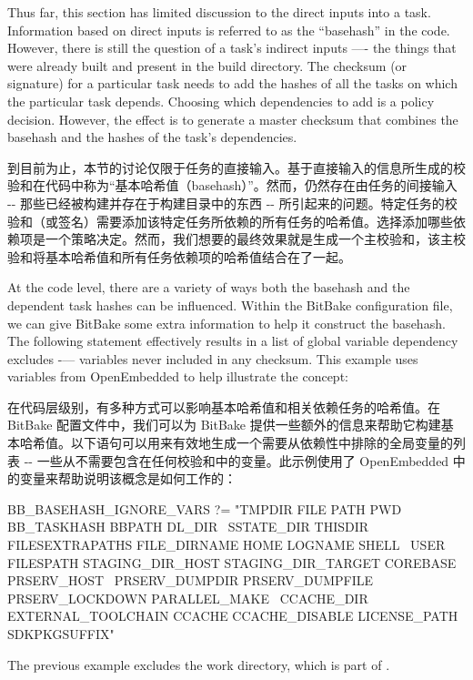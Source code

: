 Thus far, this section has limited discussion to the direct inputs into a task. Information based on direct inputs is referred to as the ``basehash'' in the code. However, there is still the question of a task's indirect inputs —{}- the things that were already built and present in the build directory. The checksum (or signature) for a particular task needs to add the hashes of all the tasks on which the particular task depends. Choosing which dependencies to add is a policy decision. However, the effect is to generate a master checksum that combines the basehash and the hashes of the task's dependencies.

到目前为止，本节的讨论仅限于任务的直接输入。基于直接输入的信息所生成的校验和在代码中称为``基本哈希值（basehash）''。然而，仍然存在由任务的间接输入 -{}- 那些已经被构建并存在于构建目录中的东西 -{}- 所引起来的问题。特定任务的校验和（或签名）需要添加该特定任务所依赖的所有任务的哈希值。选择添加哪些依赖项是一个策略决定。然而，我们想要的最终效果就是生成一个主校验和，该主校验和将基本哈希值和所有任务依赖项的哈希值结合在了一起。

At the code level, there are a variety of ways both the basehash and the dependent task hashes can be influenced. Within the BitBake configuration file, we can give BitBake some extra information to help it construct the basehash. The following statement effectively results in a list of global variable dependency excludes -{}— variables never included in any checksum. This example uses variables from OpenEmbedded to help illustrate the concept:

在代码层级别，有多种方式可以影响基本哈希值和相关依赖任务的哈希值。在 BitBake 配置文件中，我们可以为 BitBake 提供一些额外的信息来帮助它构建基本哈希值。以下语句可以用来有效地生成一个需要从依赖性中排除的全局变量的列表 -{}- 一些从不需要包含在任何校验和中的变量。此示例使用了 OpenEmbedded 中的变量来帮助说明该概念是如何工作的：

\begin{pyglist}
BB_BASEHASH_IGNORE_VARS ?= "TMPDIR FILE PATH PWD BB_TASKHASH BBPATH DL_DIR \
    SSTATE_DIR THISDIR FILESEXTRAPATHS FILE_DIRNAME HOME LOGNAME SHELL \
    USER FILESPATH STAGING_DIR_HOST STAGING_DIR_TARGET COREBASE PRSERV_HOST \
    PRSERV_DUMPDIR PRSERV_DUMPFILE PRSERV_LOCKDOWN PARALLEL_MAKE \
    CCACHE_DIR EXTERNAL_TOOLCHAIN CCACHE CCACHE_DISABLE LICENSE_PATH SDKPKGSUFFIX"
\end{pyglist}

The previous example excludes the work directory, which is part of .

